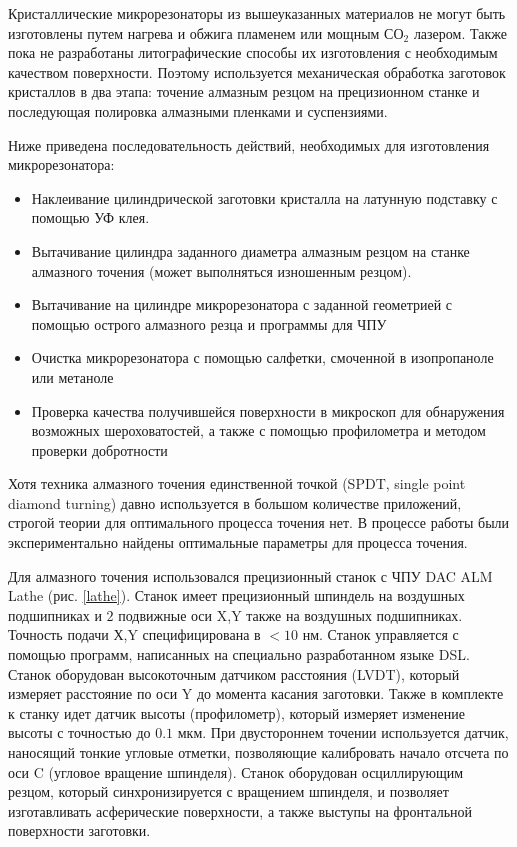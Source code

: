 Кристаллические микрорезонаторы из вышеуказанных материалов не могут быть изготовлены путем нагрева и обжига пламенем или мощным $СО_2$ лазером. Также пока не разработаны литографические способы их изготовления с необходимым качеством поверхности. Поэтому используется механическая обработка заготовок кристаллов в два этапа: точение алмазным резцом на прецизионном станке и последующая полировка алмазными пленками и суспензиями.

Ниже приведена последовательность действий, необходимых для изготовления микрорезонатора:

\begin{itemize}
  \item Наклеивание цилиндрической заготовки кристалла на латунную подставку с помощью УФ клея.
  \item Вытачивание цилиндра заданного диаметра алмазным резцом на станке алмазного точения (может выполняться изношенным резцом).
  \item Вытачивание на цилиндре микрорезонатора с заданной геометрией с помощью острого алмазного резца и программы для ЧПУ
  \item Очистка микрорезонатора с помощью салфетки, смоченной в изопропаноле или метаноле
  \item Проверка качества получившейся поверхности в микроскоп для обнаружения возможных шероховатостей, а также с помощью профилометра и методом проверки добротности
\end{itemize}

Хотя техника алмазного точения единственной точкой (SPDT, single point diamond turning) давно используется в большом количестве приложений, строгой теории для оптимального процесса точения нет. В процессе работы были экспериментально найдены оптимальные параметры для процесса точения.

Для алмазного точения использовался прецизионный станок с ЧПУ DAC ALM Lathe (рис. \ref{lathe}). Станок имеет прецизионный шпиндель на воздушных подшипниках и $2$ подвижные оси X,Y также на воздушных подшипниках. Точность подачи Х,Y специфицирована в $<10$ нм. Станок управляется с помощью программ, написанных на специально разработанном языке DSL. Станок оборудован высокоточным датчиком расстояния (LVDT), который измеряет расстояние по оси Y до момента касания заготовки. Также в комплекте к станку идет датчик высоты (профилометр), который измеряет изменение высоты с точностью до $0.1$ мкм. При двустороннем точении используется датчик, наносящий тонкие угловые отметки, позволяющие калибровать начало отсчета по оси C (угловое вращение шпинделя). Станок оборудован осциллирующим резцом, который синхронизируется с вращением шпинделя, и позволяет изготавливать асферические поверхности, а также выступы на фронтальной поверхности заготовки.

